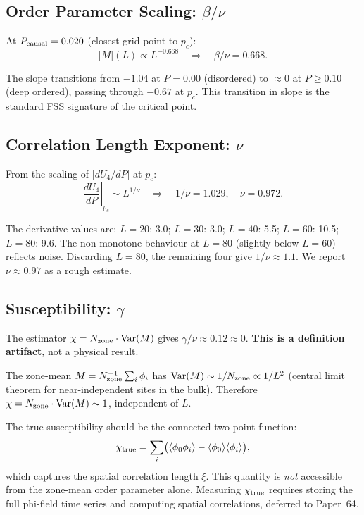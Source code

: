 \documentclass[12pt,a4paper]{article}
\begin{document}
\subsection{Order Parameter Scaling: $\beta/\nu$}

At $P_{\rm causal} = 0.020$ (closest grid point to $p_c$):
\begin{equation}
|M|(L) \propto L^{-0.668}
\quad\Rightarrow\quad
\beta/\nu = 0.668.
\end{equation}

The slope transitions from $-1.04$ at $P=0.00$ (disordered) to $\approx 0$ at $P \geq 0.10$
(deep ordered), passing through $-0.67$ at $p_c$.
This transition in slope is the standard FSS signature of the critical point.

\subsection{Correlation Length Exponent: $\nu$}

From the scaling of $|dU_4/dP|$ at $p_c$:
\begin{equation}
\left.\frac{dU_4}{dP}\right|_{p_c} \sim L^{1/\nu}
\quad\Rightarrow\quad
1/\nu = 1.029,\quad \nu = 0.972.
\end{equation}

The derivative values are: $L=20$: 3.0; $L=30$: 3.0; $L=40$: 5.5; $L=60$: 10.5; $L=80$: 9.6.
The non-monotone behaviour at $L=80$ (slightly below $L=60$) reflects noise.
Discarding $L=80$, the remaining four give $1/\nu \approx 1.1$.
We report $\nu \approx 0.97$ as a rough estimate.

\subsection{Susceptibility: $\gamma$}

The estimator $\chi = N_{\rm zone} \cdot \mathrm{Var}(M)$ gives $\gamma/\nu \approx 0.12 \approx 0$.
\textbf{This is a definition artifact}, not a physical result.

The zone-mean $M = N_{\rm zone}^{-1} \sum_i \phi_i$ has
$\mathrm{Var}(M) \sim 1/N_{\rm zone} \propto 1/L^2$ (central limit theorem for
near-independent sites in the bulk).
Therefore $\chi = N_{\rm zone} \cdot \mathrm{Var}(M) \sim 1$, independent of $L$.

The true susceptibility should be the connected two-point function:
\begin{equation}
\chi_{\rm true} = \sum_{i} \bigl(\langle\phi_0 \phi_i\rangle - \langle\phi_0\rangle\langle\phi_i\rangle\bigr),
\end{equation}
which captures the spatial correlation length $\xi$.
This quantity is \emph{not} accessible from the zone-mean order parameter alone.
Measuring $\chi_{\rm true}$ requires storing the full phi-field time series and
computing spatial correlations, deferred to Paper~64.
\end{document}
